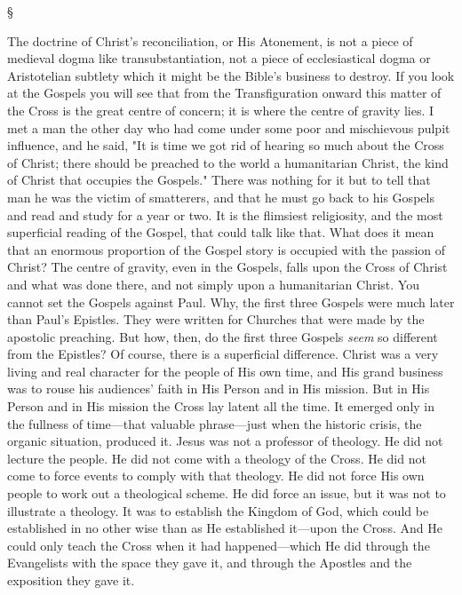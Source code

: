 \documentclass[12pt,letterpaper,oneside]{book}
\begin{document}
\begin{center}
\S
\end{center}


The doctrine of Christ's reconciliation, or His 
Atonement, is not a piece of medieval dogma 
like transubstantiation, not a piece of ecclesiastical 
dogma or Aristotelian subtlety which 
it might be the Bible's business to destroy. If 
you look at the Gospels you will see that from 
the Transfiguration onward this matter of 
the Cross is the great centre of concern; it 
is where the centre of gravity lies. I met a 
man the other day who had come under some 
poor and mischievous pulpit influence, and he 
said, "It is time we got rid of hearing so much 
about the Cross of Christ; there should be 
preached to the world a humanitarian Christ, 
the kind of Christ that occupies the Gospels." 
There was nothing for it but to tell that man 
he was the victim of smatterers, and that he 
must go back to his Gospels and read and study 
for a year or two. It is the flimsiest religiosity, 
and the most superficial reading of the Gospel, 
that could talk like that. What does it mean 
that an enormous proportion of the Gospel 
story is occupied with the passion of Christ? 
The centre of gravity, even in the Gospels, falls 
upon the Cross of Christ and what was done 
there, and not simply upon a humanitarian 
Christ. You cannot set the Gospels against 
Paul. Why, the first three Gospels were much 
later than Paul's Epistles. They were written 
for Churches that were made by the apostolic 
preaching. But how, then, do the first three 
Gospels \textit{seem} so different from the Epistles? Of 
course, there is a superficial difference. Christ 
was a very living and real character for the 
people of His own time, and His grand business 
was to rouse his audiences' faith in His Person 
and in His mission. But in His Person and in 
His mission the Cross lay latent all the time. 
It emerged only in the fullness of time---that 
valuable phrase---just when the historic crisis, 
the organic situation, produced it. Jesus was 
not a professor of theology. He did not lecture 
the people. He did not come with a theology 
of the Cross. He did not come to force events 
to comply with that theology. He did not 
force His own people to work out a theological 
scheme. He did force an issue, but it 
was not to illustrate a theology. It was to 
establish the Kingdom of God, which could 
be established in no other wise than as He 
established it---upon the Cross. And He could 
only teach the Cross when it had happened---which 
He did through the Evangelists with the 
space they gave it, and through the Apostles 
and the exposition they gave it. 
\end{document}
